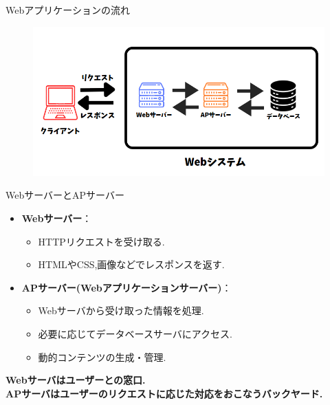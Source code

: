 \documentclass[aspectratio=169]{beamer}
\begin{document}
\begin{frame}{Webアプリケーションの流れ}
    \begin{figure}
        \includegraphics[scale=0.4]{websystem.png}
    \end{figure}
\end{frame}

\begin{frame}{WebサーバーとAPサーバー}
    \begin{itemize}
        \setlength{\parskip}{1.5em}
        \item \textbf{Webサーバー}：\\
        \begin{itemize}
            \setlength{\parskip}{1em}
            \item HTTPリクエストを受け取る\cite{webserver}.
            \item HTMLやCSS,画像などでレスポンスを返す.
        \end{itemize}
        \item \textbf{APサーバー(Webアプリケーションサーバー)}：\\
        \begin{itemize}
            \setlength{\parskip}{1em}
            \item Webサーバから受け取った情報を処理\cite{apserver}.
            \item 必要に応じてデータベースサーバにアクセス.
            \item 動的コンテンツの生成・管理.
        \end{itemize}
    \end{itemize}
    \textbf{Webサーバはユーザーとの窓口.\\APサーバはユーザーのリクエストに応じた対応をおこなうバックヤード.}
\end{frame}
\end{document}
